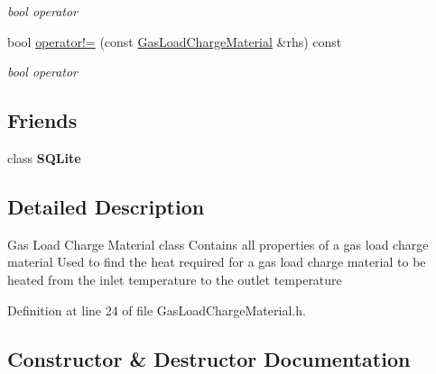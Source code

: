 \begin{DoxyCompactItemize}
\begin{DoxyCompactList}\small\item\em bool operator \end{DoxyCompactList}\item 
\mbox{\label{class_gas_load_charge_material_ac6bc3f665a91fde01ebf6d1528cb7332}} 
bool \hyperlink{class_gas_load_charge_material_ac6bc3f665a91fde01ebf6d1528cb7332}{operator!=} (const \hyperlink{class_gas_load_charge_material}{Gas\+Load\+Charge\+Material} \&rhs) const
\begin{DoxyCompactList}\small\item\em bool operator \end{DoxyCompactList}\end{DoxyCompactItemize}
\subsection*{Friends}
\begin{DoxyCompactItemize}
\item 
\mbox{\label{class_gas_load_charge_material_a0102f3b3c0cbf96db6c49f071fa5e7cc}} 
class {\bfseries S\+Q\+Lite}
\end{DoxyCompactItemize}


\subsection{Detailed Description}
Gas Load Charge Material class Contains all properties of a gas load charge material Used to find the heat required for a gas load charge material to be heated from the inlet temperature to the outlet temperature 

Definition at line 24 of file Gas\+Load\+Charge\+Material.\+h.



\subsection{Constructor \& Destructor Documentation}
\mbox{\label{class_gas_load_charge_material_a4ad94a94d25bad9eaeca4947d879f35f}} 
